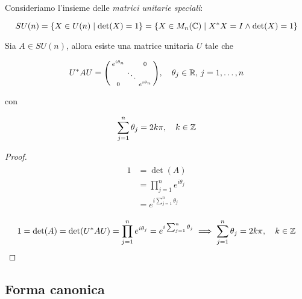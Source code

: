 Consideriamo l'insieme delle \textit{matrici unitarie speciali}:

\begin{equation}
	SU(n) = \{ X \in U(n) \mid \det(X) = 1 \} = \{ X \in M_{n}(\mathbb{C}) \mid X^{*} X = I \wedge \det(X) = 1 \}
\end{equation}

\begin{corollary}[4]
	Sia $ A \in SU(n) $, allora esiste una matrice unitaria $ U $ tale che
	
	\begin{equation}
		U^{*} A U = %
		\smqty(\dmat{ e^{i \theta_{n}} & & 0 \\ & \ddots & \\ 0 & & e^{i \theta_{n}} }) \qcomma \theta_{j} \in \R, \, j=1,\dots,n
	\end{equation}

	con
	
	\begin{equation}
		\sum_{j=1}^{n} \theta_{j} = 2 k \pi \qcomma k \in \Z
	\end{equation}
\end{corollary}

\begin{proof}
	\begin{align}
		\begin{split}
			1 &= \det(A)\\
			&= \prod_{j=1}^{n} e^{i \theta_{j}}\\
			&= e^{i \sum_{j=1}^{n} \theta_{j}}
		\end{split}
	\end{align}

	\begin{equation}
		1 = \det(A) = \det(U^{*} A U) = \prod_{j=1}^{n} e^{i \theta_{j}} = e^{i \sum_{j=1}^{n} \theta_{j}} %
		\implies%
		\sum_{j=1}^{n} \theta_{j} = 2 k \pi \qcomma k \in \Z
	\end{equation}
\end{proof}

\subsection{Forma canonica}

